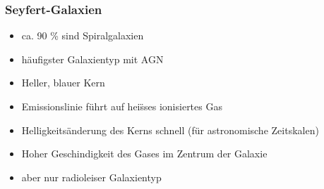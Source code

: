 \documentclass[aspectratio=1610, 9pt]{beamer}
\begin{document}
\begin{frame}\frametitle{Seyfert-Galaxien}
  \begin{itemize}
    \item ca. 90 \% sind Spiralgalaxien
    \item h\"aufigster Galaxientyp mit AGN
    \item Heller, blauer Kern
    \item Emissionslinie f\"uhrt auf hei\"sses ionisiertes Gas
    \item Helligkeits\"anderung des Kerns schnell (f\"ur astronomische Zeitskalen)
    \item Hoher Geschindigkeit des Gases im Zentrum der Galaxie
    \item aber nur radioleiser Galaxientyp
  \end{itemize}
\end{frame}
\end{document}
